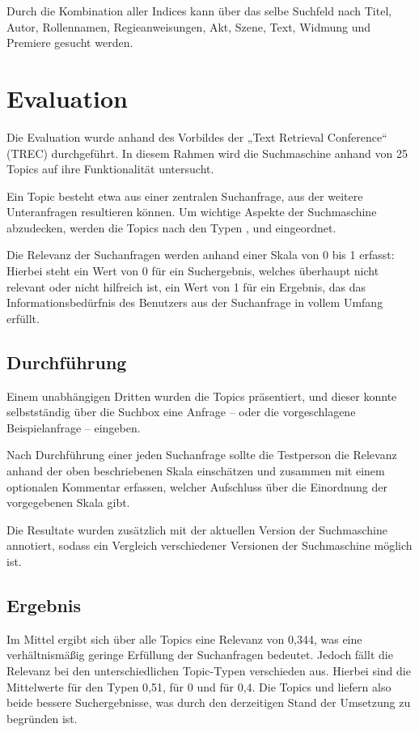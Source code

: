 Durch die Kombination aller Indices kann über das selbe Suchfeld nach
Titel, Autor, Rollennamen, Regieanweisungen, Akt, Szene,
Text, Widmung und Premiere gesucht werden.

\section{Evaluation}
Die Evaluation wurde anhand des Vorbildes der
„Text Retrieval Conference“ (TREC) durchgeführt.
In diesem Rahmen wird die Suchmaschine anhand von 25 Topics
auf ihre Funktionalität untersucht.

Ein Topic besteht etwa aus einer zentralen Suchanfrage,
aus der weitere Unteranfragen resultieren können.
Um wichtige Aspekte der Suchmaschine abzudecken,
werden die Topics nach den Typen ,
 und  eingeordnet.

Die Relevanz der Suchanfragen werden anhand einer Skala von 0 bis 1 erfasst:
Hierbei steht ein Wert von 0 für ein Suchergebnis,
welches überhaupt nicht relevant oder nicht hilfreich ist,
ein Wert von 1 für ein Ergebnis, das das Informationsbedürfnis des Benutzers
aus der Suchanfrage in vollem Umfang erfüllt.

\subsection{Durchführung}

Einem unabhängigen Dritten wurden die Topics präsentiert,
und dieser konnte selbstständig über die Suchbox
eine Anfrage -- oder die vorgeschlagene Beispielanfrage -- eingeben.

Nach Durchführung einer jeden Suchanfrage sollte die Testperson
die Relevanz anhand der oben beschriebenen Skala einschätzen
und zusammen mit einem optionalen Kommentar erfassen,
welcher Aufschluss über die Einordnung der vorgegebenen Skala gibt.

Die Resultate wurden zusätzlich
mit der aktuellen Version der Suchmaschine annotiert,
sodass ein Vergleich verschiedener Versionen der Suchmaschine möglich ist.

\subsection{Ergebnis}

Im Mittel ergibt sich über alle Topics eine Relevanz von 0,344,
was eine verhältnismäßig geringe Erfüllung der Suchanfragen bedeutet.
Jedoch fällt die Relevanz
bei den unterschiedlichen Topic-Typen verschieden aus.
Hierbei sind die Mittelwerte für den Typen  0,51,
für  0 und für  0,4.
Die Topics  und 
liefern also beide bessere Suchergebnisse,
was durch den derzeitigen Stand der Umsetzung zu begründen ist.

